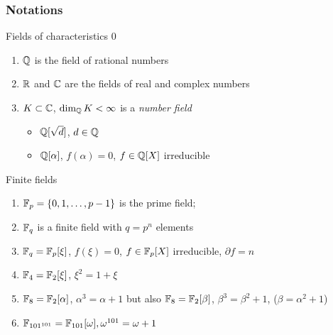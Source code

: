 \documentclass[10pt,handout]{beamer} %
\begin{document}
\begin{frame}
 \frametitle{Notations}

\begin{alertblock}{Fields of characteristics 0}
 \begin{enumerate}[<+-| alert@+>]
 \item $\mathbb Q$ is the field of rational numbers
\item $\mathbb R$ and $\mathbb C$ are the fields of real and complex numbers
\item $K\subset\mathbb C$, $\dim_\mathbb Q K<\infty$ is a \emph{number field}
\begin{itemize}
\item $\mathbb Q[\sqrt{d}]$, $d\in\mathbb Q$
\item $\mathbb Q[\alpha]$, $f(\alpha)=0$, $f\in\mathbb Q[X]$
irreducible
\end{itemize}
\end{enumerate}
\end{alertblock}

\begin{exampleblock}{Finite fields}
 \begin{enumerate}[<+-| alert@+>]
 \item $\mathbb F_p=\{0,1,\ldots,p-1\}$ is the prime field;
 \item $\mathbb F_q$ is a finite field with $q=p^n$ elements
 \item $\mathbb F_q=\mathbb F_p[\xi]$, $f(\xi)=0$, $f\in\mathbb F_p[X]$
irreducible, $\partial f=n$
\item $\mathbb F_4=\mathbb F_2[\xi]$, $\xi^2=1+\xi$
\item $\mathbb F_8=\mathbb F_2[\alpha]$, $\alpha^3=\alpha+1$ but also $\mathbb F_8=\mathbb F_2[\beta]$, $\beta^3=\beta^2+1$, ($\beta=\alpha^2+1$)
\item $\mathbb F_{101^{101}}=\mathbb F_{101}[\omega], \omega^{101}=\omega+1$
\end{enumerate}
\end{exampleblock}

\end{frame}
\end{document}
